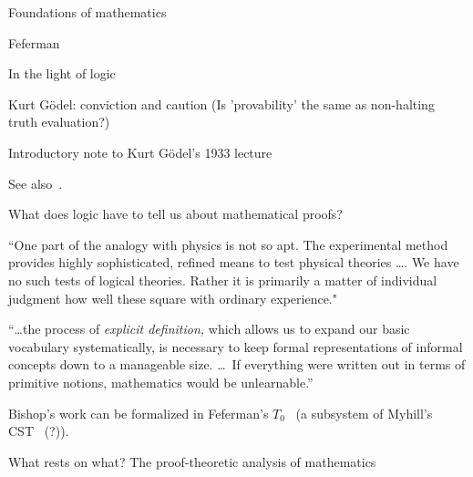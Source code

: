 \begin{plSection}{Foundations of mathematics}
\begin{plSection}{Feferman}
\begin{plSection}{In the light of logic}
\begin{plSection}{Kurt G\"{o}del: conviction and caution}
(Is 'provability' the same as non-halting truth evaluation?)

\end{plSection}%
\begin{plSection}{Introductory note to Kurt G\"{o}del's 1933 lecture}
\label{sec:Introductory_note_Godel_1933}

\cite[ch~8 ``Introductory note to Kurt G\"{o}del's 1933 lecture'']{Feferman:1998:LightOfLogic}

See also~\cite{Godel:1995:CollectedWorksIII}.

\end{plSection}%
\begin{plSection}{What does logic have to tell us about mathematical proofs?}
\label{sec:What_does_logic_tell_us_about_proofs}

\cite[ch~9 ``What does logic have to tell us about mathematical proofs?'']{Feferman:1998:LightOfLogic}

``One part of the analogy with physics is not so apt.
The experimental method provides highly sophisticated, refined
means to test physical theories {\ldots}.
We have no such tests of logical theories.
Rather it is primarily a matter of individual judgment
how well these square with ordinary
experience."~\cite[p~178]{Feferman:1998:LightOfLogic}

``\ldots the process of \textit{explicit definition,} which allows
us to expand our basic vocabulary systematically,
is necessary to keep formal representations of informal concepts
down to a manageable size. \ldots\ 
If everything were written out in terms of primitive notions,
mathematics would be 
unlearnable.''~\cite[p~180]{Feferman:1998:LightOfLogic}

Bishop's work can be formalized 
in Feferman's $T_0$~\cite{Feferman:1975:ExplicitMathematics}
(a subsystem of Myhill's CST~\cite{Myhill:1975:ConstSetTheory} (?)).

\end{plSection}%
\begin{plSection}{What rests on what? The proof-theoretic analysis of mathematics}
\label{sec:What_rests_on_what}

\cite[ch~10 ``What rests on what? 
The proof-theoretic analysis of mathematics'']{Feferman:1998:LightOfLogic}


\end{plSection}
\end{plSection}
\end{plSection}
\end{plSection}
